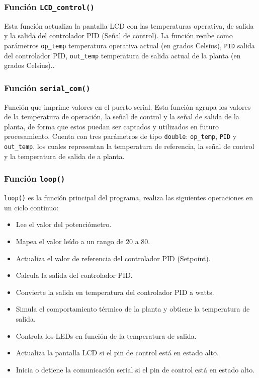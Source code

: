 \subsubsection{Función \texttt{LCD\_control()}}
Esta función actualiza la pantalla LCD con las temperaturas operativa, de salida y la salida del controlador PID (Señal de control). La función recibe como parámetros \texttt{op\_temp} temperatura operativa actual (en grados Celsius), \texttt{PID} salida del controlador PID, \texttt{out\_temp} temperatura de salida actual de la planta (en grados Celsius).. 



\subsubsection{Función \texttt{serial\_com()}}
Función que imprime valores en el puerto serial. Esta función agrupa los valores de la temperatura de operación, la señal de control y la señal de salida de la planta, de forma que estos puedan ser captados y utilizados en futuro procesamiento. Cuenta con tres parámetros de tipo \texttt{double}: \texttt{op\_temp}, \texttt{PID} y \texttt{out\_temp}, los cuales representan la temperatura de referencia, la señal de control y la temperatura de salida de a planta.

\subsubsection{Función \texttt{loop()}}
\texttt{loop()} es la función principal del programa, realiza las siguientes operaciones en un ciclo continuo:
\begin{itemize}
    \item Lee el valor del potenciómetro.
    \item Mapea el valor leído a un rango de 20 a 80.
    \item Actualiza el valor de referencia del controlador PID (Setpoint).
    \item Calcula la salida del controlador PID.
    \item Convierte la salida en temperatura del controlador PID a watts.
    \item Simula el comportamiento térmico de la planta y obtiene la temperatura de salida.
    \item Controla los LEDs en función de la temperatura de salida.
    \item Actualiza la pantalla LCD si el pin de control está en estado alto.
    \item Inicia o detiene la comunicación serial si el pin de control está en estado alto.
\end{itemize}


